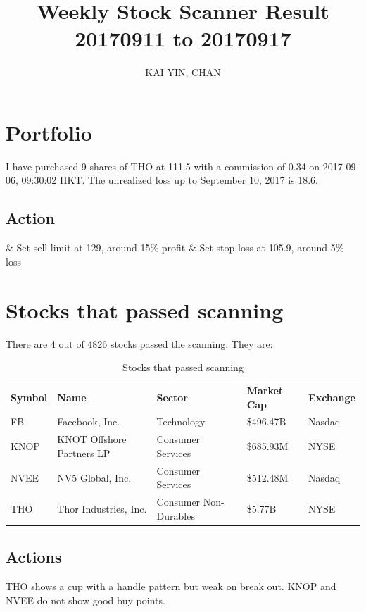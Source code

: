 \documentclass{article}
\begin{document}
\title{Weekly Stock Scanner Result \\ 20170911 to 20170917}
\author{KAI YIN, CHAN}
\maketitle

\section{Portfolio}
I have purchased 9 shares of THO at 111.5 with a commission of 0.34 on 2017-09-06, 09:30:02 HKT. The unrealized loss up to September 10, 2017 is 18.6.

\subsection{Action}
\begin{easylist}
& Set sell limit at 129, around 15\% profit
& Set stop loss at 105.9, around 5\% loss
\end{easylist}

\section{Stocks that passed scanning}

There are 4 out of 4826 stocks passed the scanning.  They are:
\begin{table}[htbp]
  \caption{Stocks that passed scanning}
    \begin{tabular}{lllll}
    \textbf{Symbol} & \textbf{Name} & \textbf{Sector} & \textbf{Market Cap} & \textbf{Exchange} \\
    FB    & Facebook, Inc. & Technology & \$496.47B & Nasdaq \\
    KNOP  & KNOT Offshore Partners LP & Consumer Services & \$685.93M & NYSE \\
    NVEE  & NV5 Global, Inc. & Consumer Services & \$512.48M & Nasdaq \\
    THO   & Thor Industries, Inc. & Consumer Non-Durables & \$5.77B & NYSE \\
    \end{tabular}%
  \label{tab:addlabel}%
\end{table}%

\subsection{Actions}
THO shows a cup with a handle pattern but weak on break out. KNOP and NVEE do not show good buy points.
\end{document}
